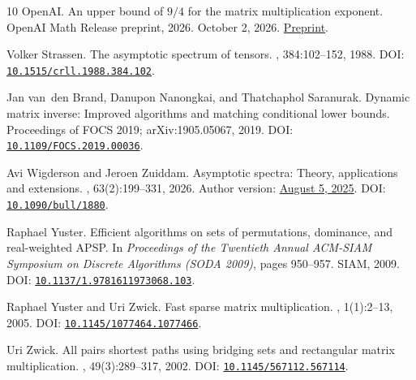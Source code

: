 \documentclass[11pt]{article}
\makeatletter
\renewcommand{\@seccntformat}[1]{\csname the#1\endcsname.\quad}
\newcommand{\doi}[1]{\href{https://doi.org/#1}{\nolinkurl{#1}}}
\makeatother
\begin{document}
\begin{thebibliography}{10}
{OpenAI}.
\newblock An upper bound of {$9/4$} for the matrix multiplication exponent.
\newblock OpenAI Math Release preprint, 2026.
\newblock October 2, 2026.
\newblock \href{https://github.com/openai/math/tree/main/preprints/Matrix-Multiplication-Nine-Fourths-October-2-2026}{Preprint}.

Volker Strassen.
\newblock The asymptotic spectrum of tensors.
,
  384:102--152, 1988.
\newblock DOI: \doi{10.1515/crll.1988.384.102}.

Jan van~den Brand, Danupon Nanongkai, and Thatchaphol Saranurak.
\newblock Dynamic matrix inverse: Improved algorithms and matching conditional
  lower bounds.
\newblock Proceedings of FOCS 2019; arXiv:1905.05067, 2019.
\newblock DOI: \doi{10.1109/FOCS.2019.00036}.

Avi Wigderson and Jeroen Zuiddam.
\newblock Asymptotic spectra: Theory, applications and extensions.
,
  63(2):199--331, 2026.
\newblock Author version:
  \href{https://www.math.ias.edu/~avi/PUBLICATIONS/Wigderson_Zuiddam_2025.pdf}{August 5, 2025}.
\newblock DOI: \doi{10.1090/bull/1880}.

Raphael Yuster.
\newblock Efficient algorithms on sets of permutations, dominance, and
  real-weighted {APSP}.
\newblock In {\em Proceedings of the Twentieth Annual ACM-SIAM Symposium on
  Discrete Algorithms (SODA 2009)}, pages 950--957. SIAM, 2009.
\newblock DOI: \doi{10.1137/1.9781611973068.103}.

Raphael Yuster and Uri Zwick.
\newblock Fast sparse matrix multiplication.
, 1(1):2--13, 2005.
\newblock DOI: \doi{10.1145/1077464.1077466}.

Uri Zwick.
\newblock All pairs shortest paths using bridging sets and rectangular matrix
  multiplication.
, 49(3):289--317, 2002.
\newblock DOI: \doi{10.1145/567112.567114}.

\end{thebibliography}

\clearpage
\appendix
\makeatletter
\renewcommand{\@seccntformat}[1]{\appendixname~\csname the#1\endcsname.\quad}
\makeatother
{}
\end{document}
